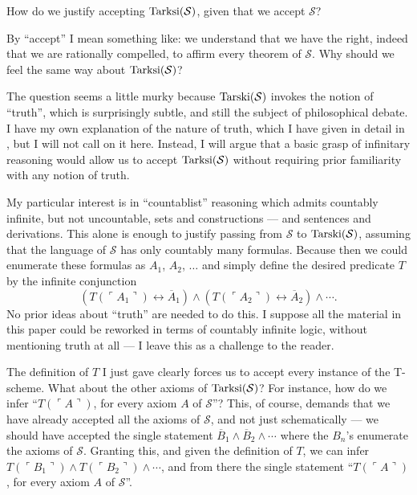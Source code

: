 \documentclass{amsart}
\begin{document}
How do we justify accepting ${\rm Tarksi}(\mathcal{S})$, given that we accept $\mathcal{S}$?

By ``accept'' I mean something like: we understand that we have the right, indeed that we are rationally compelled,
to affirm every theorem of $\mathcal{S}$. Why should we feel the same way about ${\rm Tarksi}(\mathcal{S})$?

The question seems a little murky because ${\rm Tarski}(\mathcal{S})$ invokes the notion of ``truth'', which is
surprisingly subtle, and still the subject of philosophical debate. I have my own explanation of the nature
of truth, which I have given in detail in \cite{weaver2}, but I will not call on it here. Instead, I will argue that
a basic grasp of infinitary reasoning would allow us to accept ${\rm Tarksi}(\mathcal{S})$ without requiring
prior familiarity with any notion of truth.

My particular interest is in ``countablist'' reasoning which admits countably infinite, but not uncountable, sets and
constructions --- and sentences and derivations. This alone is enough to justify passing from $\mathcal{S}$
to ${\rm Tarski}(\mathcal{S})$, assuming that the language of $\mathcal{S}$ has only countably many formulas.
Because then we could enumerate these formulas as $A_1$, $A_2$, $\ldots$ and simply define the desired
predicate $T$ by the infinite conjunction
$$(T(\ulcorner A_1\urcorner) \leftrightarrow \overline{A}_1)\wedge
(T(\ulcorner A_2\urcorner) \leftrightarrow \overline{A}_2) \wedge \cdots.$$
No prior ideas about ``truth'' are needed
to do this. I suppose all the material in this paper could be reworked in terms of countably infinite logic,
without mentioning truth at all --- I leave this as a challenge to the reader.

The definition of $T$ I just gave clearly forces us to accept every instance of the T-scheme. What about the
other axioms of ${\rm Tarksi}(\mathcal{S})$? For instance, how do we infer ``$T(\ulcorner A\urcorner)$,
for every axiom $A$ of $\mathcal{S}$''?  This, of course, demands that we have already accepted all the
axioms of $\mathcal{S}$, and not just schematically --- we should have accepted the single statement
$\overline{B}_1 \wedge \overline{B}_2 \wedge \cdots$ where the $B_n$'s enumerate the axioms of $\mathcal{S}$. Granting this, and given the definition of $T$, we can infer $T(\ulcorner B_1\urcorner) \wedge
T(\ulcorner B_2\urcorner) \wedge \cdots$, and from there the single statement ``$T(\ulcorner A\urcorner)$,
for every axiom $A$ of $\mathcal{S}$''.
\end{document}
